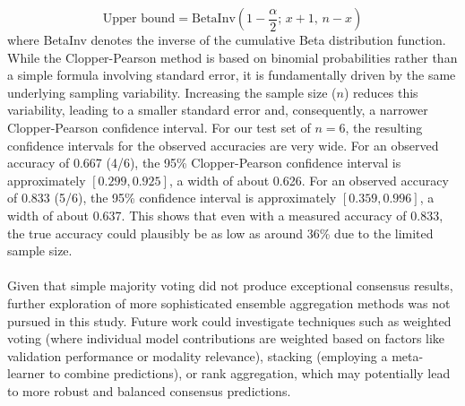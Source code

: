 \documentclass[12pt,a4paper]{report}
\begin{document}
\[
\text{Upper bound} = \text{BetaInv}\left(1 - \frac{\alpha}{2};\, x + 1,\, n - x\right)
\]
where BetaInv denotes the inverse of the cumulative Beta distribution function. While the Clopper-Pearson method is based on binomial probabilities rather than a simple formula involving standard error, it is fundamentally driven by the same underlying sampling variability. Increasing the sample size ($n$) reduces this variability, leading to a smaller standard error and, consequently, a narrower Clopper-Pearson confidence interval. For our test set of $n=6$, the resulting confidence intervals for the observed accuracies are very wide. For an observed accuracy of 0.667 (4/6), the 95\% Clopper-Pearson confidence interval is approximately $[0.299, 0.925]$, a width of about 0.626. For an observed accuracy of 0.833 (5/6), the 95\% confidence interval is approximately $[0.359, 0.996]$, a width of about 0.637. This shows that even with a measured accuracy of 0.833, the true accuracy could plausibly be as low as around 36\% due to the limited sample size.\\
\\
Given that simple majority voting did not produce exceptional consensus results, further exploration of more sophisticated ensemble aggregation methods was not pursued in this study. Future work could investigate techniques such as weighted voting (where individual model contributions are weighted based on factors like validation performance or modality relevance), stacking (employing a meta-learner to combine predictions), or rank aggregation, which may potentially lead to more robust and balanced consensus predictions.




\end{document}
